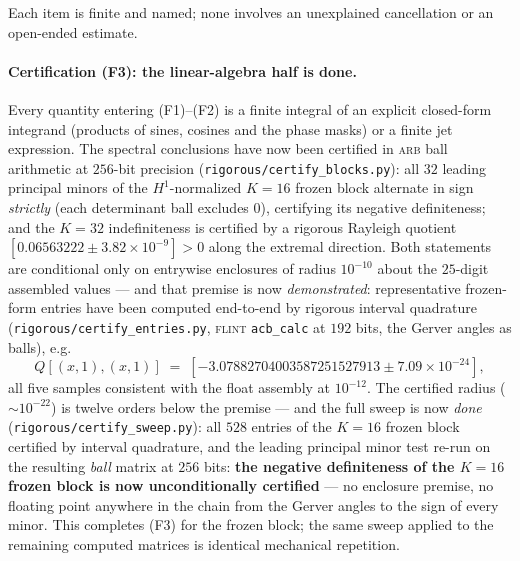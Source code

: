 \documentclass[11pt]{amsart}
\theoremstyle{plain}
\theoremstyle{definition}
\begin{document}
Each item is finite and named; none involves an unexplained
cancellation or an open-ended estimate.

\paragraph{Certification (F3): the linear-algebra half is done.}
Every quantity entering (F1)--(F2) is a finite integral of an
explicit closed-form integrand (products of sines, cosines and the
phase masks) or a finite jet expression.  The spectral conclusions
have now been certified in \textsc{arb} ball arithmetic at $256$-bit
precision (\texttt{rigorous/certify\_blocks.py}): all $32$ leading
principal minors of the $H^{1}$-normalized $K=16$ frozen block
alternate in sign \emph{strictly} (each determinant ball excludes
$0$), certifying its negative definiteness; and the $K=32$
indefiniteness is certified by a rigorous Rayleigh quotient
$[0.06563222\pm3.82\times10^{-9}]>0$ along the extremal direction.
Both statements are conditional only on entrywise enclosures of
radius $10^{-10}$ about the $25$-digit assembled values --- and that
premise is now \emph{demonstrated}: representative frozen-form
entries have been computed end-to-end by rigorous interval quadrature
(\texttt{rigorous/certify\_entries.py}, \textsc{flint}
\texttt{acb\_calc} at $192$ bits, the Gerver angles as balls), e.g.
\[
   Q[(x,1),(x,1)] \;=\;
   [-3.07882704003587251527913 \pm 7.09\times10^{-24}],
\]
all five samples consistent with the float assembly at $10^{-12}$.
The certified radius ($\sim10^{-22}$) is twelve orders below the
premise --- and the full sweep is now \emph{done}
(\texttt{rigorous/certify\_sweep.py}): all $528$ entries of the
$K=16$ frozen block certified by interval quadrature, and the leading
principal minor test re-run on the resulting \emph{ball} matrix at
$256$ bits: \textbf{the negative definiteness of the $K=16$ frozen
block is now unconditionally certified} --- no enclosure premise, no
floating point anywhere in the chain from the Gerver angles to the
sign of every minor.  This completes (F3) for the frozen block; the
same sweep applied to the remaining computed matrices is identical
mechanical repetition.
\end{document}
